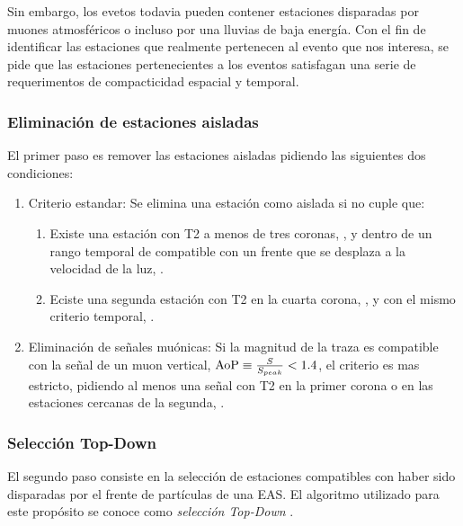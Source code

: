 	
	Sin embargo, los evetos todavia pueden contener estaciones disparadas por muones atmosféricos o incluso por una lluvias de baja energía.
	Con el fin de identificar las estaciones que realmente pertenecen al evento que nos interesa, se pide que las estaciones pertenecientes a los eventos satisfagan una serie de requerimentos de compacticidad espacial y temporal.
	
	\subsubsection{Eliminación de estaciones aisladas} 
	
	El primer paso es remover las estaciones aisladas pidiendo las siguientes dos condiciones:
	\begin{enumerate}
	 \item Criterio estandar: Se elimina una estación como aislada si no cuple que:
	 \begin{enumerate}
	  \item Existe una estación con T2 a menos de tres coronas, , y dentro de un rango temporal de compatible con un frente que se desplaza a la velocidad de la luz, .
	  \item Eciste una segunda estación con T2 en la cuarta corona, , y con el mismo criterio temporal, .
	 \end{enumerate}
	 \item Eliminación de señales muónicas: Si la magnitud de la traza es compatible con la señal de un muon vertical, ${\rm AoP} \equiv \frac{S}{S_{peak}}<1.4$, el criterio es mas estricto, pidiendo al menos una señal con T2 en la primer corona o en las estaciones cercanas de la segunda, .
	\end{enumerate}
	
	\subsubsection{Selección Top-Down} 
	
	El segundo paso consiste en la selección de estaciones compatibles con haber sido disparadas por el frente de partículas de una EAS.
	El algoritmo utilizado para este propósito se conoce como \emph{selección Top-Down} \cite{topDownSel}.
	
